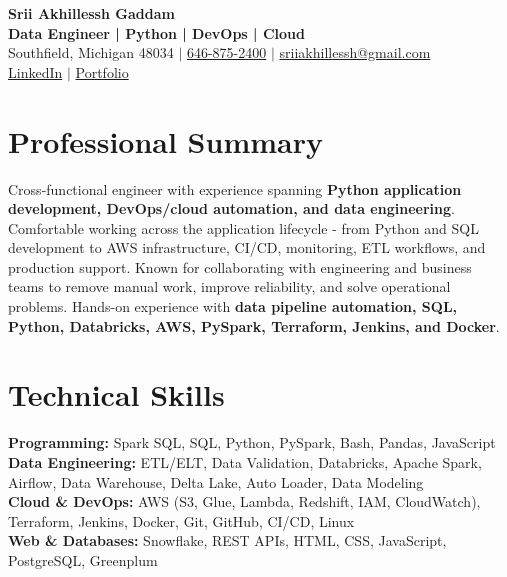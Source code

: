 \documentclass[letterpaper,10pt]{article}
\begin{document}
\fontsize{9.35pt}{10.45pt}\selectfont

\begin{center}
    {\LARGE \textbf{Srii Akhillessh Gaddam}} \\[-1pt]
    \textbf{Data Engineer | Python | DevOps | Cloud} \\[2pt]
    Southfield, Michigan 48034 $|$
    \href{tel:6468752400}{646-875-2400} $|$
    \href{mailto:sriiakhillessh@gmail.com}{sriiakhillessh@gmail.com} \\[1pt]
    \href{https://www.linkedin.com/in/srii-akhiilessh-gaddam-b48668191/}{LinkedIn} $|$
    \href{https://sriiakhillesshg.github.io/portfolio/}{Portfolio}
\end{center}
\vspace{-8pt}

\section{Professional Summary}
\small{Cross-functional engineer with experience spanning \textbf{Python application development, DevOps/cloud automation, and data engineering}. Comfortable working across the application lifecycle - from Python and SQL development to AWS infrastructure, CI/CD, monitoring, ETL workflows, and production support. Known for collaborating with engineering and business teams to remove manual work, improve reliability, and solve operational problems. Hands-on experience with \textbf{data pipeline automation, SQL, Python, Databricks, AWS, PySpark, Terraform, Jenkins, and Docker}.}

\section{Technical Skills}
\small{
\textbf{Programming:} Spark SQL, SQL, Python, PySpark, Bash, Pandas, JavaScript \\
\textbf{Data Engineering:} ETL/ELT, Data Validation, Databricks, Apache Spark, Airflow, Data Warehouse, Delta Lake, Auto Loader, Data Modeling \\
\textbf{Cloud \& DevOps:} AWS (S3, Glue, Lambda, Redshift, IAM, CloudWatch), Terraform, Jenkins, Docker, Git, GitHub, CI/CD, Linux \\
\textbf{Web \& Databases:} Snowflake, REST APIs, HTML, CSS, JavaScript, PostgreSQL, Greenplum
}
\end{document}
